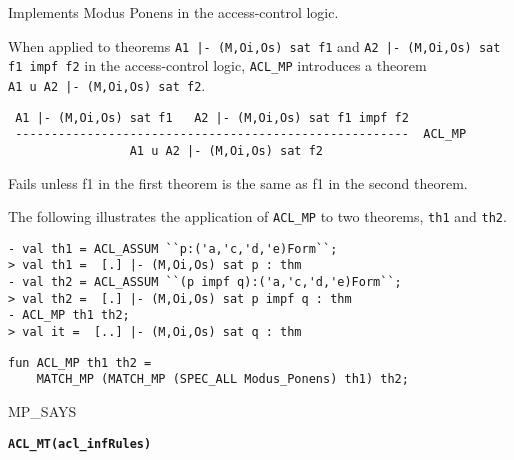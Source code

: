 \SYNOPSIS
Implements Modus Ponens in the access-control logic.

\DESCRIBE
When applied to theorems \texttt{A1 |- (M,Oi,Os) sat f1} and
\texttt{A2 |- (M,Oi,Os) sat f1 impf f2} in the access-control logic,
\texttt{ACL_MP} introduces a theorem\\ \texttt{A1 u A2 |- (M,Oi,Os) sat
  f2}.

\begin{verbatim}
 A1 |- (M,Oi,Os) sat f1   A2 |- (M,Oi,Os) sat f1 impf f2
 -------------------------------------------------------  ACL_MP
                 A1 u A2 |- (M,Oi,Os) sat f2
\end{verbatim}

\FAILURE 
Fails unless f1 in the first theorem is the same as f1 in the
second theorem.  

\EXAMPLE
The following illustrates the application of \texttt{ACL\_MP} to two
theorems, \texttt{th1} and \texttt{th2}.
\begin{holboxed}
\begin{verbatim}
- val th1 = ACL_ASSUM ``p:('a,'c,'d,'e)Form``;
> val th1 =  [.] |- (M,Oi,Os) sat p : thm
- val th2 = ACL_ASSUM ``(p impf q):('a,'c,'d,'e)Form``;
> val th2 =  [.] |- (M,Oi,Os) sat p impf q : thm
- ACL_MP th1 th2;
> val it =  [..] |- (M,Oi,Os) sat q : thm
\end{verbatim}
\end{holboxed}

\IMPLEMENTATION
\begin{holboxed}
\begin{verbatim}
fun ACL_MP th1 th2 = 
    MATCH_MP (MATCH_MP (SPEC_ALL Modus_Ponens) th1) th2;
\end{verbatim}
\end{holboxed}

\SEEALSO
MP\_SAYS
\ENDDOC

\begin{holboxed}
  \begin{Large}
    \textbf{\texttt{ACL\_MT}}\hfill{}\textbf{\texttt{(acl\_infRules)}}
  \end{Large}
\end{holboxed}

